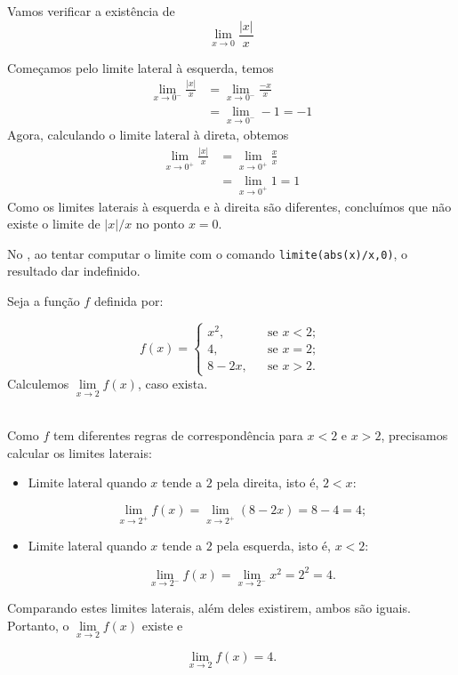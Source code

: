 \cleardoublepage\documentclass[../main.tex]{subfiles}
\begin{document}
\begin{ex}
  Vamos verificar a existência de
  \begin{equation*}
    \lim_{x\to 0} \frac{|x|}{x}
  \end{equation*}
  \begin{solution}
      Começamos pelo limite lateral à esquerda, temos
  \begin{align*}
    \lim_{x\to 0^-} \frac{|x|}{x} &= \lim_{x\to 0^-} \frac{-x}{x}\\
    &= \lim_{x\to 0^-} -1 = -1
  \end{align*}
  Agora, calculando o limite lateral à direta, obtemos
  \begin{align*}
    \lim_{x\to 0^+} \frac{|x|}{x} &= \lim_{x\to 0^+} \frac{x}{x}\\
    &= \lim_{x\to 0^+} 1 = 1
  \end{align*}
  Como os limites laterais à esquerda e à direita são diferentes, concluímos que não existe o limite de $|x|/x$ no ponto $x=0$.

    No \geogebra, ao tentar computar o limite com o comando \verb+limite(abs(x)/x,0)+, o resultado dar indefinido. 
  \end{solution}
  \end{ex}
\begin{ex}
  Seja a função \( f\) definida por:

\[f(x)=\left\{\begin{array}{ccl} x^2, & &\mbox{se } x<2; \\ 4 ,& &\mbox{se } x=2; \\ 8-2x, &&\mbox{se } x> 2. \end{array}\right. \]
Calculemos \(\lim\limits_{x \to 2} f(x)\), caso exista.\\\\
\begin{solution}
Como \(f\) tem diferentes regras de correspondência para \( x<2\) e \( x>2\), precisamos calcular os limites laterais:
\begin{itemize}
    \item Limite lateral quando \( x\) tende a \(2\) pela direita, isto é, \( 2<x\):

\[ \lim\limits_{x \to 2^{+}} f(x)= \lim\limits_{x \to 2^{+}}( 8-2x )=8-4=4; \]
\item Limite lateral quando \( x\) tende a \( 2\) pela esquerda, isto é, \( x<2\):

\[ \lim\limits_{x \to 2^{-}} f(x)= \lim\limits_{x \to 2^{-}} x^2 =2^2=4. \]
\end{itemize}
Comparando estes limites laterais, além deles existirem, ambos são iguais. Portanto, o \(\lim\limits_{x \to 2} f(x)\) existe e

\[\lim\limits_{x \to 2} f(x)=4.\]
\end{solution}
\end{ex}
\end{document}
